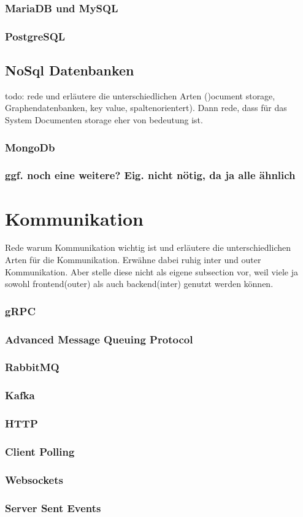 \subsubsection{MariaDB und MySQL}
\subsubsection{PostgreSQL}

\subsection{NoSql Datenbanken}
todo: rede und erläutere die unterschiedlichen Arten ()ocument storage, Graphendatenbanken, key value, spaltenorientert).
Dann rede, dass für das System Documenten storage eher von bedeutung ist.
\subsubsection{MongoDb}
\subsubsection{ggf. noch eine weitere? Eig. nicht nötig, da ja alle ähnlich}

\section{Kommunikation}
Rede warum Kommunikation wichtig ist und erläutere die unterschiedlichen Arten für die Kommunikation. Erwähne dabei ruhig inter und outer Kommunikation. Aber stelle diese nicht als eigene subsection vor, weil viele ja sowohl frontend(outer) als auch backend(inter) genutzt werden können.


\subsubsection{gRPC}
\subsubsection{Advanced Message Queuing Protocol}
\subsubsection{RabbitMQ}
\subsubsection{Kafka}



\subsubsection{HTTP}

\subsubsection{Client Polling}

\subsubsection{Websockets}

\subsubsection{Server Sent Events}
